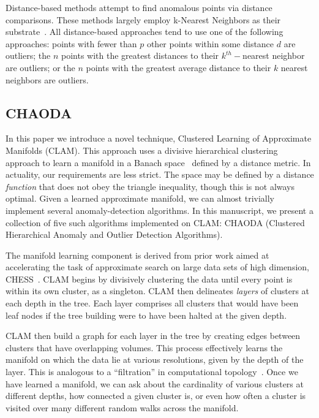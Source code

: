 Distance-based methods attempt to find anomalous points via distance comparisons.
These methods largely employ k-Nearest Neighbors as their substrate~\cite{wang2019progress}.
All distance-based approaches tend to use one of the following approaches: points with fewer than $p$ other points within some distance $d$ are outliers; the $n$ points with the greatest distances to their $k^{th}-$nearest neighbor are outliers; or the $n$ points with the greatest average distance to their $k$ nearest neighbors are outliers.

\subsection{CHAODA}
\label{introduction:chaoda}

In this paper we introduce a novel technique, Clustered Learning of Approximate Manifolds (CLAM).
This approach uses a divisive hierarchical clustering approach to learn a manifold in a Banach space~\cite{banach1929fonctionnelles} defined by a distance metric.
In actuality, our requirements are less strict.
The space may be defined by a distance \textit{function} that does not obey the triangle inequality, though this is not always optimal. 
Given a learned approximate manifold, we can almost trivially implement several anomaly-detection algorithms.
In this manuscript, we present a collection of five such algorithms implemented on CLAM: CHAODA (Clustered Hierarchical Anomaly and Outlier Detection Algorithms).

The manifold learning component is derived from prior work aimed at accelerating the task of approximate search on large data sets of high dimension, CHESS~\cite{ishaq2019entropy}.
CLAM begins by divisively clustering the data until every point is within its own cluster, as a singleton.
CLAM then delineates \textit{layers} of clusters at each depth in the tree.
Each layer comprises all clusters that would have been leaf nodes if the tree building were to have been halted at the given depth.

CLAM then build a graph for each layer in the tree by creating edges between clusters that have overlapping volumes.
This process effectively learns the manifold on which the data lie at various resolutions, given by the depth of the layer.
This is analogous to a ``filtration'' in computational topology~\cite{carlsson2009topology}.
Once we have learned a manifold, we can ask about the cardinality of various clusters at different depths, how connected a given cluster is, or even how often a cluster is visited over many different random walks across the manifold.

